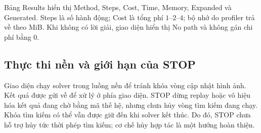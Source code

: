 Bảng Results hiển thị Method, Steps, Cost, Time, Memory, Expanded và Generated. Steps là số hành động; Cost là tổng phí $1$--$2$--$4$; bộ nhớ do profiler trả về theo MiB. Khi không có lời giải, giao diện hiển thị No path và không gán chi phí bằng $0$.

\subsection{Thực thi nền và giới hạn của STOP}
Giao diện chạy solver trong luồng nền để tránh khóa vòng cập nhật hình ảnh. Kết quả được gửi về để xử lý ở phía giao diện. STOP dừng replay hoặc vô hiệu hóa kết quả đang chờ bằng mã thế hệ, nhưng chưa hủy vòng tìm kiếm đang chạy. Khóa tìm kiếm có thể vẫn được giữ đến khi solver kết thúc. Do đó, STOP chưa hỗ trợ hủy tức thời phép tìm kiếm; cơ chế hủy hợp tác là một hướng hoàn thiện.


